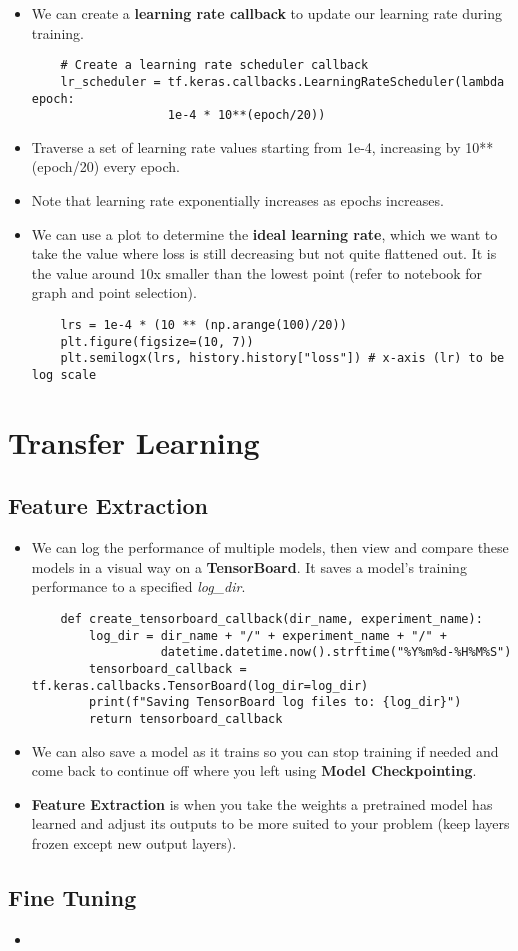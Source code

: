 \documentclass[11pt, a4paper]{article}
\begin{document}
	\begin{itemize}
		\item We can create a \textbf{learning rate callback} to update our learning rate during training.
	\begin{lstlisting}
	# Create a learning rate scheduler callback
	lr_scheduler = tf.keras.callbacks.LearningRateScheduler(lambda epoch: 
	               1e-4 * 10**(epoch/20)) \end{lstlisting}
		\item Traverse a set of learning rate values starting from 1e-4, increasing by 10**(epoch/20) every epoch.
		\item Note that learning rate exponentially increases as epochs increases.
		\item We can use a plot to determine the \textbf{ideal learning rate}, which we want to take the value where loss is still decreasing but not quite flattened out. It is the value around 10x smaller than the lowest point (refer to notebook for graph and point selection).
	\begin{lstlisting}
	lrs = 1e-4 * (10 ** (np.arange(100)/20))
	plt.figure(figsize=(10, 7))
	plt.semilogx(lrs, history.history["loss"]) # x-axis (lr) to be log scale \end{lstlisting}
	\end{itemize} \newpage

	
	\section{Transfer Learning}
	\subsection{Feature Extraction}
	\begin{itemize}
		\item We can log the performance of multiple models, then view and compare these models in a visual way on a \textbf{TensorBoard}. It saves a model's training performance to a specified \textit{log\_dir}.
	\begin{lstlisting}
	def create_tensorboard_callback(dir_name, experiment_name):
		log_dir = dir_name + "/" + experiment_name + "/" +
		          datetime.datetime.now().strftime("%Y%m%d-%H%M%S")
		tensorboard_callback = tf.keras.callbacks.TensorBoard(log_dir=log_dir)
		print(f"Saving TensorBoard log files to: {log_dir}")
		return tensorboard_callback	\end{lstlisting}
		\item We can also save a model as it trains so you can stop training if needed and come back to continue off where you left using \textbf{Model Checkpointing}.
		\item \textbf{Feature Extraction} is when you take the weights a pretrained model has learned and adjust its outputs to be more suited to your problem (keep layers frozen except new output layers).
	\end{itemize} \vspace*{2mm}

	\subsection{Fine Tuning}
	\begin{itemize}
		\item 
	\end{itemize}
	
	
	
	
	
	
	
\end{document}
